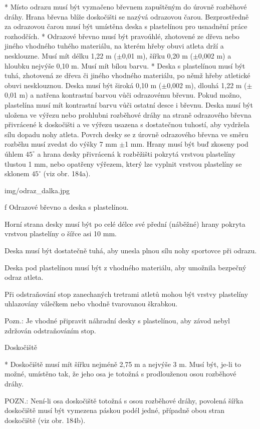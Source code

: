 * Místo odrazu musí být vyznačeno břevnem zapuštěným do úrovně rozběhové dráhy. Hrana břevna blíže doskočišti se nazývá odrazovou čarou. Bezprostředně za odrazovou čarou musí být umístěna deska s plastelínou pro usnadnění práce rozhodčích.
* Odrazové břevno musí být pravoúhlé, zhotovené ze dřeva nebo jiného vhodného tuhého materiálu, na kterém hřeby obuvi atleta drží a nesklouzne. Musí mít délku 1,22 m ($\pm$0,01 m), šířku 0,20 m ($\pm$0,002 m) a hloubku nejvýše 0,10 m. Musí mít bílou barvu.
* Deska s plastelínou musí být tuhá, zhotovená ze dřeva či jiného vhodného materiálu, po němž hřeby atletické obuvi nesklouznou. Deska musí být široká 0,10 m ($\pm$0,002 m), dlouhá 1,22 m ($\pm$0,01 m) a natřena kontrastní barvou vůči odrazovému břevnu. Pokud možno, plastelína musí mít kontrastní barvu vůči ostatní desce i břevnu. Deska musí být uložena ve výřezu nebo prohlubni rozběhové dráhy na straně odrazového břevna přivrácené k doskočišti a ve výřezu usazena s dostatečnou tuhostí, aby vydržela sílu dopadu nohy atleta. Povrch desky se z úrovně odrazového břevna ve směru rozběhu musí zvedat do výšky 7 mm $\pm$1 mm. Hrany musí být buď zkoseny pod úhlem $45^\circ$ a hrana desky přivrácená k rozběžišti pokrytá vrstvou plastelíny tlustou 1 mm, nebo opatřeny výřezem, který lze vyplnit vrstvou plastelíny se sklonem $45^\circ$ (viz obr. 184a).

\picw=8cm \inspic img/odraz_dalka.jpg
\caption/f Odrazové břevno a deska s plastelínou.

Horní strana desky musí být po celé délce své přední (náběžné) hrany pokryta vrstvou plastelíny o šířce asi 10 mm.

Deska musí být dostatečně tuhá, aby unesla plnou sílu nohy sportovce při odrazu.

Deska pod plastelínou musí být z vhodného materiálu, aby umožnila bezpečný odraz atleta.

Při odstraňování stop zanechaných tretrami atletů mohou být vrstvy plastelíny uhlazovány válečkem nebo vhodně tvarovanou škrabkou.

Pozn.: Je vhodné připravit náhradní desky s plastelínou, aby závod nebyl zdržován odstraňováním stop.

Doskočiště

* Doskočiště musí mít šířku nejméně 2,75 m a nejvýše 3 m. Musí být, je-li to možné, umístěno tak, že jeho osa je totožná s prodlouženou osou rozběhové dráhy.

POZN.: Není-li osa doskočiště totožná s osou rozběhové dráhy, povolená šířka doskočiště musí být vymezena páskou podél jedné, případně obou stran doskočiště (viz obr. 184b).

